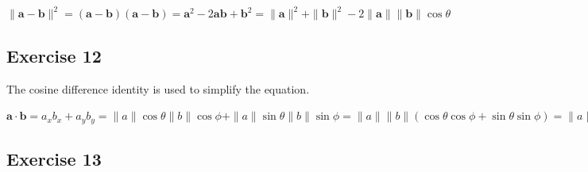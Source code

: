 \documentclass[11pt]{article}
\begin{document}
$\|\textbf{a}-\textbf{b}\|^2=(\textbf{a}-\textbf{b})(\textbf{a}-\textbf{b})=\textbf{a}^2-2\textbf{a}\textbf{b}+\textbf{b}^2=\|\textbf{a}\|^2+\|\textbf{b}\|^2-2\|\textbf{a}\|\|\textbf{b}\|\cos\theta$

\subsection{Exercise 12}

The cosine difference identity is used to simplify the equation.

$\textbf{a}\cdot{}\textbf{b}=a_xb_x+a_yb_y=\|a\|\cos\theta\|b\|\cos\phi+\|a\|\sin\theta\|b\|\sin\phi=\|a\|\|b\|(\cos\theta\cos\phi+\sin\theta\sin\phi)=\|a\|\|b\|\cos(\theta-\phi)$

\subsection{Exercise 13}
\end{document}
